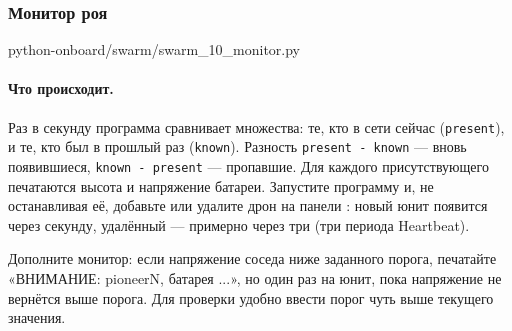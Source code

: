 \subsubsection*{Монитор роя}

\begin{codefile}[python]{python-onboard/swarm/swarm_10_monitor.py}
\end{codefile}

\paragraph{Что происходит.} Раз в секунду программа сравнивает множества: те, кто в сети сейчас (\verb|present|), и те, кто был в прошлый раз (\verb|known|). Разность \verb|present - known| --- вновь появившиеся, \verb|known - present| --- пропавшие. Для каждого присутствующего печатаются высота и напряжение батареи. Запустите программу и, не останавливая её, добавьте или удалите дрон на панели : новый юнит появится через секунду, удалённый --- примерно через три (три периода Heartbeat).

\begin{taskbox}
Дополните монитор: если напряжение соседа ниже заданного порога, печатайте «ВНИМАНИЕ: pioneerN, батарея ...», но один раз на юнит, пока напряжение не вернётся выше порога. Для проверки удобно ввести порог чуть выше текущего значения.
\end{taskbox}
